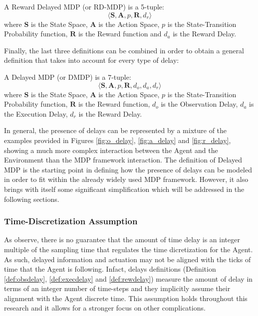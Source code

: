             \begin{definition}
                \label{def:rdmdp}
                A Reward Delayed MDP (or RD-MDP) is a 5-tuple:
                \[ \langle \mathbf{S}, \mathbf{A}, p, \mathbf{R}, d_r \rangle\]
                where $\mathbf{S}$ is the State Space, $\mathbf{A}$ is the Action Space, $p$ is the State-Transition Probability function, $\mathbf{R}$ is the Reward function and $d_a$ is the Reward Delay.
            \end{definition}
        
            Finally, the last three definitions can be combined in order to obtain a general definition that takes into account for every type of delay:
            
            \begin{definition}
                \label{def:dmdp}
                A Delayed MDP (or DMDP) is a 7-tuple:
                \[ \langle \mathbf{S}, \mathbf{A}, p, \mathbf{R}, d_o, d_a, d_r \rangle\]
                where $\mathbf{S}$ is the State Space, $\mathbf{A}$ is the Action Space, $p$ is the State-Transition Probability function, $\mathbf{R}$ is the Reward function, $d_o$ is the Observation Delay, $d_a$ is the Execution Delay, $d_r$ is the Reward Delay.
            \end{definition}
            
            In general, the presence of delays can be represented by a mixture of the examples provided in Figures \ref{fig:o_delay}, \ref{fig:a_delay} and \ref{fig:r_delay}, showing a much more complex interaction between the Agent and the Environment than the MDP framework interaction. \newline
            The definition of Delayed MDP is the starting point in defining how the presence of delays can be modeled in order to fit within the already widely used MDP framework. However, it also brings with itself some significant simplification which will be addressed in the following sections.
            
            \subsubsection{Time-Discretization Assumption}
                As  observe, there is no guarantee that the amount of time delay is an integer multiple of the sampling time that regulates the time dicretization for the Agent. As such, delayed information and actuation may not be aligned with the ticks of time that the Agent is following. Infact, delays definitions (Definition \ref{def:obsdelay}, \ref{def:execdelay} and \ref{def:rewdelay}) measure the amount of delay in terms of an integer number of time-steps and they implicitly assume their alignment with the Agent discrete time. This assumption holds throughout this research and it allows for a stronger focus on other complications.
        

